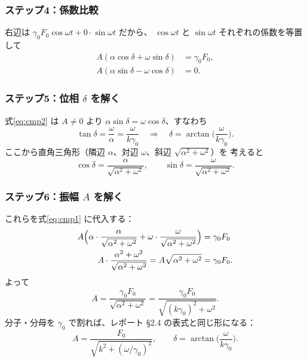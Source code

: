 \documentclass[11pt,a4paper]{article}
\newcommand{\gamz}{\gamma_{0}}
\begin{document}
\subsubsection{ステップ4：係数比較}

右辺は $\gamz F_0\cos\omega t+0\cdot\sin\omega t$ だから、
$\cos\omega t$ と $\sin\omega t$ それぞれの係数を等置して
\begin{align}
A(\alpha\cos\delta+\omega\sin\delta)&=\gamz F_0, \label{eq:cmp1}\\
A(\alpha\sin\delta-\omega\cos\delta)&=0. \label{eq:cmp2}
\end{align}

\subsubsection{ステップ5：位相 $\delta$ を解く}

式\eqref{eq:cmp2} は $A\neq0$ より $\alpha\sin\delta=\omega\cos\delta$、すなわち
\begin{equation}
\tan\delta=\frac{\omega}{\alpha}=\frac{\omega}{k\gamz}
\quad\Longrightarrow\quad
\delta=\arctan\!\Big(\frac{\omega}{k\gamz}\Big).
\end{equation}
ここから直角三角形（隣辺 $\alpha$、対辺 $\omega$、斜辺 $\sqrt{\alpha^2+\omega^2}$）を
考えると
\begin{equation}
\cos\delta=\frac{\alpha}{\sqrt{\alpha^2+\omega^2}},\qquad
\sin\delta=\frac{\omega}{\sqrt{\alpha^2+\omega^2}}.
\end{equation}

\subsubsection{ステップ6：振幅 $A$ を解く}

これらを式\eqref{eq:cmp1} に代入する：
\begin{align}
A\Big(\alpha\cdot\frac{\alpha}{\sqrt{\alpha^2+\omega^2}}
+\omega\cdot\frac{\omega}{\sqrt{\alpha^2+\omega^2}}\Big)
&=\gamz F_0\notag\\
A\cdot\frac{\alpha^2+\omega^2}{\sqrt{\alpha^2+\omega^2}}
=A\sqrt{\alpha^2+\omega^2}&=\gamz F_0.
\end{align}
よって
\begin{equation}
A=\frac{\gamz F_0}{\sqrt{\alpha^2+\omega^2}}
=\frac{\gamz F_0}{\sqrt{(k\gamz)^2+\omega^2}}.
\end{equation}
分子・分母を $\gamz$ で割れば、レポート §2.4 の表式と同じ形になる：
\begin{equation}
\boxed{\;A=\frac{F_0}{\sqrt{k^2+(\omega/\gamz)^2}},\qquad
\delta=\arctan\!\Big(\frac{\omega}{k\gamz}\Big).\;}
\end{equation}
\end{document}
